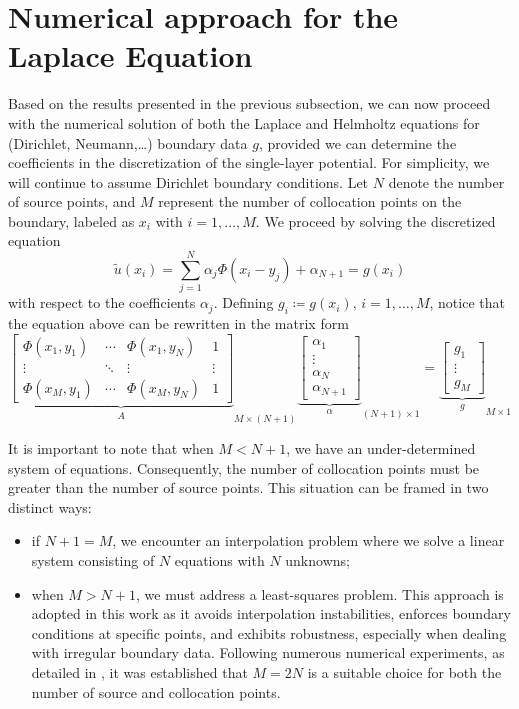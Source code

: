 \section{Numerical approach for the Laplace Equation}\label{n_a_MFS_lap}
Based on the results presented in the previous subsection, we can now proceed with the numerical solution of both the Laplace and Helmholtz equations for (Dirichlet, Neumann,\dots) boundary data \(g\), provided we can determine the coefficients in the discretization of the single-layer potential. For simplicity, we will continue to assume Dirichlet boundary conditions. Let \(N\) denote the number of source points, and \(M\) represent the number of collocation points on the boundary, labeled as \(x_i\) with \(i=1,\dots, M\). We proceed by solving the discretized equation
\[
    \tilde{u}(x_i) = \sum_{j=1}^{N} \alpha_j \Phi(x_i-y_j) + \alpha_{N+1} = g(x_i)
\]
with respect to the coefficients \(\alpha_j\). Defining \(g_i \coloneq g(x_i), \, i=1,\dots, M\), notice that the equation above can be rewritten in the matrix form
\begin{equation}\label{MFS_m_system}
    {\underbrace{\begin{bmatrix}
        \Phi(x_1, y_1) & \cdots & \Phi(x_1, y_N) & 1 \\
        \vdots & \ddots & \vdots & \vdots\\
        \Phi(x_M, y_1) & \cdots & \Phi(x_M, y_N) & 1
    \end{bmatrix}}_{A}}_{M\times (N+1)}
    {\underbrace{\begin{bmatrix}
        \alpha_1\\
        \vdots\\
        \alpha_N\\
        \alpha_{N+1}
    \end{bmatrix}}_\alpha}_{(N+1)\times 1}
    =
    {\underbrace{\begin{bmatrix}
        g_1\\
        \vdots\\
        g_M
    \end{bmatrix}}_g}_{M\times 1}
\end{equation}

It is important to note that when \(M < N+1\), we have an under-determined system of equations. Consequently, the number of collocation points must be greater than the number of source points. This situation can be framed in two distinct ways:
\begin{itemize}
    \item if \(N+1=M\), we encounter an interpolation problem where we solve a linear system consisting of \(N\) equations with \(N\) unknowns;

    \item when \(M > N+1\), we must address a least-squares problem. This approach is adopted in this work as it avoids interpolation instabilities, enforces boundary conditions at specific points, and exhibits robustness, especially when dealing with irregular boundary data. Following numerous numerical experiments, as detailed in \cite{alves2009choice}, it was established that \(M=2N\) is a suitable choice for both the number of source and collocation points.
\end{itemize}

